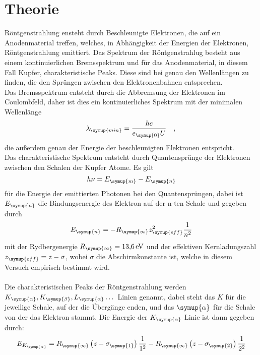 \section{Theorie}
\label{sec:Theorie}
Röntgenstrahlung ensteht durch Beschleunigte Elektronen, die auf ein Anodenmaterial
treffen, welches, in Abhängigkeit der Energien der Elektronen, Röntgenstrahlung
emittiert. Das Spektrum der Röntgenstrahlug besteht aus einem kontinuierlichen Bremsspektrum
und für das Anodenmaterial, in diesem Fall Kupfer, charakteristische Peaks.
Diese sind bei genau den Wellenlängen zu finden, die den Sprüngen zwischen den
Elektronenbahnen entsprechen.\\
Das Bremsspektrum entsteht durch die Abbremsung der Elektronen im Coulombfeld, daher ist
dies ein kontinuierliches Spektrum mit der minimalen Wellenlänge
\begin{equation}
  \lambda_\symup{min} = \dfrac{hc}{e_\symup{0}U} \quad,
  \label{eqn:lambda_min}\\
\end{equation}
die außerdem genau der Energie der beschleunigten Elektronen entspricht.\\
Das charakteristische Spektrum entsteht durch Quantensprünge der Elektronen zwischen
den Schalen der Kupfer Atome. Es gilt
\begin{equation}
  h \nu = E_\symup{m} - E_\symup{n}
  \label{eqn:hnu}\\
\end{equation}
für die Energie der emittierten Photonen bei den Quantensprüngen, dabei ist $E_\symup{n}$ die
Bindungsenergie des Elektron auf der n-ten Schale und gegeben durch
\begin{equation}
  E_\symup{n} = -R_\symup{\infty} z_\symup{eff}^2 \dfrac{1}{n^2}
  \label{eqn:E_n}\\
\end{equation}
mit der Rydbergenergie $R_\symup{\infty} = \SI{13.6}{\electronvolt}$ und der effektiven
Kernladungszahl $z_\symup{eff} = z - \sigma$, wobei $\sigma$ die Abschirmkonstante ist, welche
in diesem Versuch empirisch bestimmt wird.\\\\
Die charakteristischen Peaks der Röntgenstrahlung werden $K_\symup{\alpha},K_\symup{\beta},
L_\symup{\alpha}\dots$ Linien genannt, dabei steht das $K$ für die jeweilige Schale, auf der die Übergänge
enden, und das $\symup{\alpha}$ für die Schale von der das Elektron stammt. Die Energie
der $K_\symup{\alpha}$ Linie ist dann gegeben durch:
\begin{equation}
  E_{K_\symup{\alpha}} = R_\symup{\infty} \left(z - \sigma_\symup{1} \right)\dfrac{1}{1^2} -
  R_\symup{\infty}\left(z - \sigma_\symup{2}\right) \dfrac{1}{2^2}
  \label{eqn:E_K_a}\\
\end{equation}
